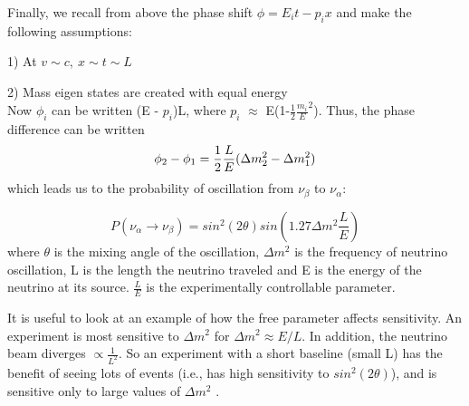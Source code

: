 \documentclass[12pt]{article}
\begin{document}
\noindent Finally, we recall from above the phase shift $\phi = E_i t-p_i x$ and make the following assumptions:
\par 1) At $v\sim c,\ x\sim t\sim L$
\par 2) Mass eigen states are created with equal energy\\
\noindent Now $\phi_i$ can be written (E - $p_i$)L, where $p_i$ $\approx$ E(1-$\frac{1}{2}\frac{m_i}{E}^2$). Thus, the phase difference can be written 
\begin{equation}
\\ \phi_2-\phi_1 = \frac{1}{2}\frac{L}{E}(\Delta m_2^2 - \Delta m_1^2)
\end{equation}
which leads us to the probability of oscillation from $\nu_\beta$ to $\nu_\alpha$:

\begin{equation} \label{eq:prob}
P(\nu_\alpha \rightarrow \nu_\beta) = sin^2(2\theta)sin(1.27\Delta m^2  \frac{L}{E})
\end{equation}
where $\theta$ is the mixing angle of the oscillation, $\Delta m^2$ is the frequency of neutrino oscillation, L is the length the neutrino traveled and E is the energy of the neutrino at its source.  $\frac{L}{E}$ is the experimentally controllable parameter. 
\par It is useful to look at an example of how the free parameter affects sensitivity.  An experiment is most sensitive to $\Delta m^2$ for $\Delta m^2 \approx E/L$.  In addition, the neutrino beam diverges $\propto \frac{1}{L^2}$.  So an experiment with a short baseline (small L) has the benefit of seeing lots of events (i.e., has high sensitivity to $sin^2(2\theta)$), and is sensitive only to large values of $\Delta m^2$ \cite{warwick}. 
\end{document}
